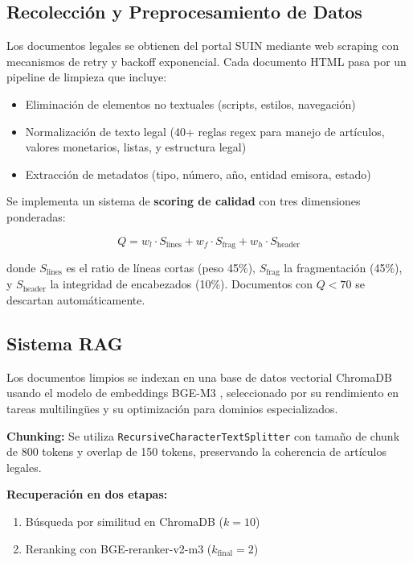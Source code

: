 \documentclass[conference]{IEEEtran}
\begin{document}
\subsection{Recolecci\'on y Preprocesamiento de Datos}
\label{sec:data}

Los documentos legales se obtienen del portal SUIN mediante web scraping con mecanismos de retry y backoff exponencial. Cada documento HTML pasa por un pipeline de limpieza que incluye:

\begin{itemize}
    \item Eliminaci\'on de elementos no textuales (scripts, estilos, navegaci\'on)
    \item Normalizaci\'on de texto legal (40+ reglas regex para manejo de art\'iculos, valores monetarios, listas, y estructura legal)
    \item Extracci\'on de metadatos (tipo, n\'umero, a\~no, entidad emisora, estado)
\end{itemize}

Se implementa un sistema de \textbf{scoring de calidad} con tres dimensiones ponderadas:

\begin{equation}
    Q = w_l \cdot S_{\text{lines}} + w_f \cdot S_{\text{frag}} + w_h \cdot S_{\text{header}}
\end{equation}

donde $S_{\text{lines}}$ es el ratio de l\'ineas cortas (peso 45\%), $S_{\text{frag}}$ la fragmentaci\'on (45\%), y $S_{\text{header}}$ la integridad de encabezados (10\%). Documentos con $Q < 70$ se descartan autom\'aticamente.

\subsection{Sistema RAG}
\label{sec:rag}

Los documentos limpios se indexan en una base de datos vectorial ChromaDB usando el modelo de embeddings BGE-M3 \cite{chen2024bge}, seleccionado por su rendimiento en tareas multiling\"ues y su optimizaci\'on para dominios especializados.

\textbf{Chunking:} Se utiliza \texttt{RecursiveCharacterTextSplitter} con tama\~no de chunk de 800 tokens y overlap de 150 tokens, preservando la coherencia de art\'iculos legales.

\textbf{Recuperaci\'on en dos etapas:}
\begin{enumerate}
    \item B\'usqueda por similitud en ChromaDB ($k=10$)
    \item Reranking con BGE-reranker-v2-m3 ($k_{\text{final}}=2$)
\end{enumerate}
\end{document}
